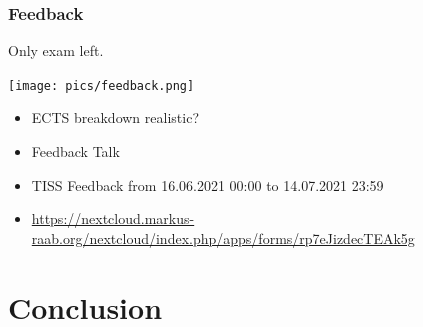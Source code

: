 \begin{frame}
	\frametitle{Feedback}
	Only exam left.

	\hfill \texttt{[image: pics/feedback.png]}
	\vspace{-1cm}
	\begin{itemize}
		\item ECTS breakdown realistic?
		\item Feedback Talk
		\item TISS Feedback from 16.06.2021 00:00 to 14.07.2021 23:59
		\item \tiny \url{https://nextcloud.markus-raab.org/nextcloud/index.php/apps/forms/rp7eJizdecTEAk5g}
	\end{itemize}
\end{frame}

\section{Conclusion}

